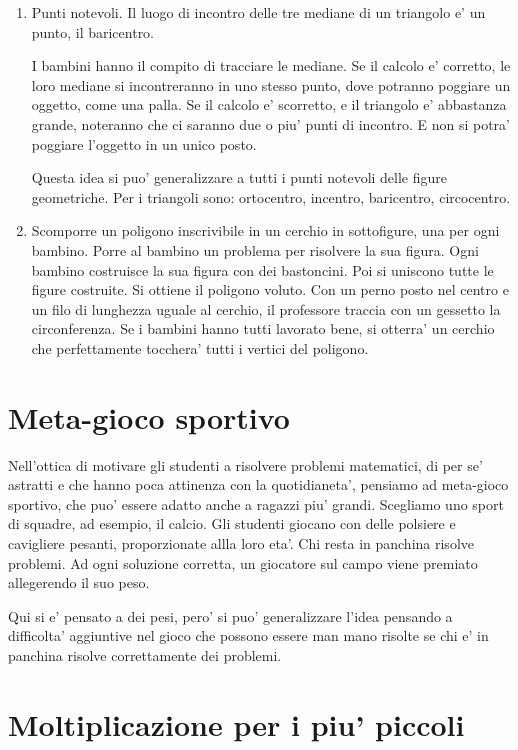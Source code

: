 \documentclass[a4paper]{article}
\begin{document}
\begin{enumerate}
    \item Punti notevoli. Il luogo di incontro delle tre mediane di un triangolo e' un punto, il baricentro.

        I bambini hanno il compito di tracciare le mediane. Se il calcolo e' corretto, le loro mediane si incontreranno in uno stesso punto, dove potranno poggiare un oggetto, come una palla. Se il calcolo e' scorretto, e il triangolo e' abbastanza grande, noteranno che ci saranno due o piu' punti di incontro. E non si potra' poggiare l'oggetto in un unico posto.

        Questa idea si puo' generalizzare a tutti i punti notevoli delle figure geometriche. Per i triangoli sono: ortocentro, incentro, baricentro, circocentro.

    \item Scomporre un poligono inscrivibile in un cerchio in sottofigure, una per ogni bambino. Porre al bambino un problema per risolvere la sua figura. Ogni bambino costruisce la sua figura con dei bastoncini. Poi si uniscono tutte le figure costruite. Si ottiene il poligono voluto. Con un perno posto nel centro e un filo di lunghezza uguale al cerchio, il professore traccia con un gessetto la circonferenza. Se i bambini hanno tutti lavorato bene, si otterra' un cerchio che perfettamente tocchera' tutti i vertici del poligono.

\end{enumerate}

\section{Meta-gioco sportivo}
Nell'ottica di motivare gli studenti a risolvere problemi matematici, di per se' astratti e che hanno poca attinenza con la quotidianeta', pensiamo ad meta-gioco sportivo, che puo' essere adatto anche a ragazzi piu' grandi. Scegliamo uno sport di squadre, ad esempio, il calcio. Gli studenti giocano con delle polsiere e cavigliere pesanti, proporzionate allla loro eta'. Chi resta in panchina risolve problemi. Ad ogni soluzione corretta, un giocatore sul campo viene premiato allegerendo il suo peso. 

Qui si e' pensato a dei pesi, pero' si puo' generalizzare l'idea pensando a difficolta' aggiuntive nel gioco che possono essere man mano risolte se chi e' in panchina risolve correttamente dei problemi.


\section{Moltiplicazione per i piu' piccoli}
\end{document}
